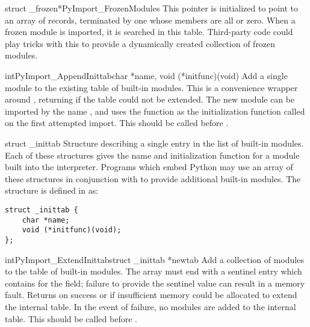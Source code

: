 \documentclass{manual}
\begin{document}
\begin{cvardesc}{struct _frozen*}{PyImport_FrozenModules}
This pointer is initialized to point to an array of  records, terminated by one whose members are all
\NULL{} or zero.  When a frozen module is imported, it is searched in
this table.  Third-party code could play tricks with this to provide a 
dynamically created collection of frozen modules.
\end{cvardesc}

\begin{cfuncdesc}{int}{PyImport_AppendInittab}{char *name,
                                               void (*initfunc)(void)}
Add a single module to the existing table of built-in modules.  This
is a convenience wrapper around ,
returning  if the table could not be extended.  The new
module can be imported by the name , and uses the function
 as the initialization function called on the first
attempted import.  This should be called before
.
\end{cfuncdesc}

\begin{ctypedesc}[_inittab]{struct _inittab}
Structure describing a single entry in the list of built-in modules.
Each of these structures gives the name and initialization function
for a module built into the interpreter.  Programs which embed Python
may use an array of these structures in conjunction with
 to provide additional built-in
modules.  The structure is defined in  as:

\begin{verbatim}
struct _inittab {
    char *name;
    void (*initfunc)(void);
};
\end{verbatim}
\end{ctypedesc}

\begin{cfuncdesc}{int}{PyImport_ExtendInittab}{struct _inittab *newtab}
Add a collection of modules to the table of built-in modules.  The
 array must end with a sentinel entry which contains
\NULL{} for the  field; failure to provide the sentinel
value can result in a memory fault.  Returns  on success or
 if insufficient memory could be allocated to extend the
internal table.  In the event of failure, no modules are added to the
internal table.  This should be called before
.
\end{cfuncdesc}
\end{document}
